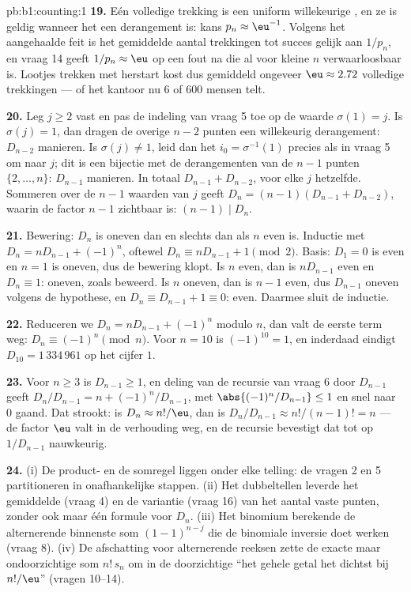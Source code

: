 \begin{solution}{pb:b1:counting:1}
\textbf{19.} Eén volledige trekking is een uniform willekeurige
, en ze is geldig wanneer het een derangement is: kans $p_n
\approx \eu^{-1}$. Volgens het aangehaalde feit is het gemiddelde aantal
trekkingen tot succes gelijk aan $1/p_n$, en vraag 14 geeft $1/p_n
\approx \eu$ op een fout na die al voor kleine $n$ verwaarloosbaar is.
Lootjes trekken met herstart kost dus gemiddeld ongeveer $\eu \approx
2.72$ volledige trekkingen --- of het kantoor nu $6$ of $600$ mensen
telt.

\textbf{20.} Leg $j \geq 2$ vast en pas de indeling van vraag 5 toe op de
waarde $\sigma(1) = j$. Is $\sigma(j) = 1$, dan dragen de overige $n - 2$
punten een willekeurig derangement: $D_{n-2}$ manieren. Is $\sigma(j)
\neq 1$, leid dan het  $i_0 = \sigma^{-1}(1)$ precies als in
vraag 5 om naar $j$; dit is een bijectie met de derangementen van de $n -
1$ punten $\{2, \dots, n\}$: $D_{n-1}$ manieren. In totaal $D_{n-1} +
D_{n-2}$, voor elke $j$ hetzelfde. Sommeren over de $n - 1$ waarden van
$j$ geeft $D_n = (n-1)(D_{n-1} + D_{n-2})$, waarin de factor $n - 1$
zichtbaar is: $(n-1) \mid D_n$.

\textbf{21.} Bewering: $D_n$ is oneven dan en slechts dan als $n$ even
is. Inductie met $D_n = nD_{n-1} + (-1)^n$, oftewel $D_n \equiv nD_{n-1}
+ 1 \pmod 2$. Basis: $D_1 = 0$ is even en $n = 1$ is oneven, dus de
bewering klopt. Is $n$ even, dan is $nD_{n-1}$ even en $D_n \equiv 1$:
oneven, zoals beweerd. Is $n$ oneven, dan is $n - 1$ even, dus $D_{n-1}$
oneven volgens de hypothese, en $D_n \equiv D_{n-1} + 1 \equiv 0$: even.
Daarmee sluit de inductie.

\textbf{22.} Reduceren we $D_n = nD_{n-1} + (-1)^n$ modulo $n$, dan valt
de eerste term weg: $D_n \equiv (-1)^n \pmod n$. Voor $n = 10$ is
$(-1)^{10} = 1$, en inderdaad eindigt $D_{10} = 1\,334\,961$ op het
cijfer $1$.

\textbf{23.} Voor $n \geq 3$ is $D_{n-1} \geq 1$, en deling van de
recursie van vraag 6 door $D_{n-1}$ geeft $D_n/D_{n-1} = n +
(-1)^n/D_{n-1}$, met $\abs{(-1)^n/D_{n-1}} \leq 1$ en snel naar $0$
gaand. Dat strookt: is $D_n \approx n!/\eu$, dan is $D_n/D_{n-1} \approx
n!/(n-1)! = n$ --- de factor $\eu$ valt in de verhouding weg, en de
recursie bevestigt dat tot op $1/D_{n-1}$ nauwkeurig.

\textbf{24.} (i) De product- en de somregel liggen onder elke telling:
de vragen 2 en 5 partitioneren   in
onafhankelijke stappen. (ii) Het dubbeltellen leverde het gemiddelde
(vraag 4) en de variantie (vraag 16) van het aantal vaste punten, zonder
ook maar één formule voor $D_n$. (iii) Het binomium berekende de
alternerende binnenste som $(1-1)^{n-j}$ die de binomiale inversie doet
werken (vraag 8). (iv) De afschatting voor alternerende reeksen zette de
exacte maar ondoorzichtige som $n!\,s_n$ om in de doorzichtige 
``het gehele getal het dichtst bij $n!/\eu$'' (vragen 10--14).


\end{solution}
